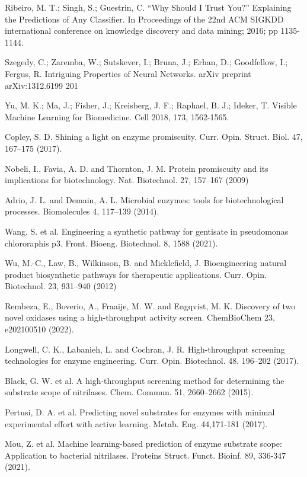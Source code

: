 \documentclass[12pt]{article}
\begin{document}
\begin{thebibliography}{20}
 Ribeiro, M. T.; Singh, S.; Guestrin, C. “Why Should I Trust You?” Explaining the Predictions of Any Classiﬁer. In Proceedings of the 22nd ACM SIGKDD international conference on knowledge discovery and data mining; 2016; pp 1135-1144.

 Szegedy, C.; Zaremba, W.; Sutskever, I.; Bruna, J.; Erhan, D.; Goodfellow, I.; Fergus, R. Intriguing Properties of Neural Networks. arXiv preprint arXiv:1312.6199 201

 Yu, M. K.; Ma, J.; Fisher, J.; Kreisberg, J. F.; Raphael, B. J.; Ideker, T. Visible Machine Learning for Biomedicine. Cell 2018, 173, 1562-1565.


 Copley, S. D. Shining a light on enzyme promiscuity. Curr. Opin. Struct. Biol. 47, 167–175 (2017).

 Nobeli, I., Favia, A. D. and Thornton, J. M. Protein promiscuity and its implications for biotechnology. Nat. Biotechnol. 27, 157–167 (2009)

 Adrio, J. L. and Demain, A. L. Microbial enzymes: tools for biotechnological processes. Biomolecules 4, 117–139 (2014).

 Wang, S. et al. Engineering a synthetic pathway for gentisate in pseudomonas chlororaphis p3. Front. Bioeng. Biotechnol. 8, 1588 (2021).

 Wu, M.-C., Law, B., Wilkinson, B. and Mickleﬁeld, J. Bioengineering natural product biosynthetic pathways for therapeutic applications. Curr. Opin. Biotechnol. 23, 931–940 (2012)


 Rembeza, E., Boverio, A., Fraaije, M. W. and Engqvist, M. K. Discovery of two novel oxidases using a high-throughput activity screen. ChemBioChem 23, e202100510 (2022).

 Longwell, C. K., Labanieh, L. and Cochran, J. R. High-throughput screening technologies for enzyme engineering. Curr. Opin. Biotechnol. 48, 196–202 (2017).

 Black, G. W. et al. A high-throughput screening method for determining the substrate scope of nitrilases. Chem. Commun. 51, 2660–2662 (2015).

 Pertusi, D. A. et al. Predicting novel substrates for enzymes with minimal experimental effort with active learning. Metab. Eng. 44,171-181 (2017).

 Mou, Z. et al. Machine learning-based prediction of enzyme substrate scope: Application to bacterial nitrilases. Proteins Struct. Funct. Bioinf. 89, 336-347 (2021).


\end{thebibliography}
\end{document}
